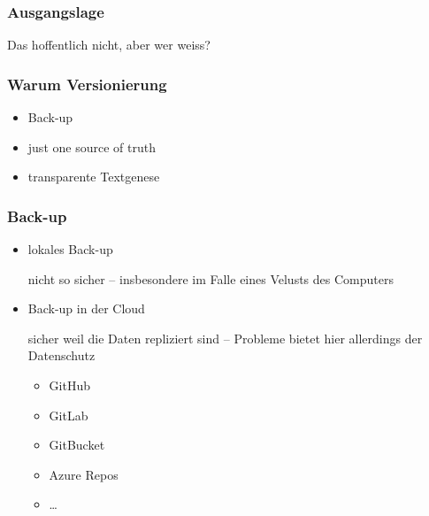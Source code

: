 \documentclass[table]{beamer}
\begin{document}
    \begin{frame}
        \frametitle{Ausgangslage}
        Das hoffentlich nicht, aber wer weiss?

        \vspace*{5mm}

       
    \end{frame}

    \begin{frame}
        \frametitle{Warum Versionierung}

        \begin{itemize}
            \item Back-up
            \item just one source of truth
            \item transparente Textgenese
        \end{itemize}
    \end{frame}

    \begin{frame}
        \frametitle{Back-up}

        \begin{itemize}
            \item lokales Back-up
                
            nicht so sicher -- insbesondere im Falle eines Velusts des
            Computers
            
           \item Back-up in der Cloud
           
           sicher weil die Daten repliziert sind -- Probleme bietet hier
           allerdings der Datenschutz

           \begin{itemize}
            \item GitHub
            \item GitLab
            \item GitBucket
            \item Azure Repos
            \item \dots
           \end{itemize}
        \end{itemize}   
        
    
    \end{frame}
\end{document}
